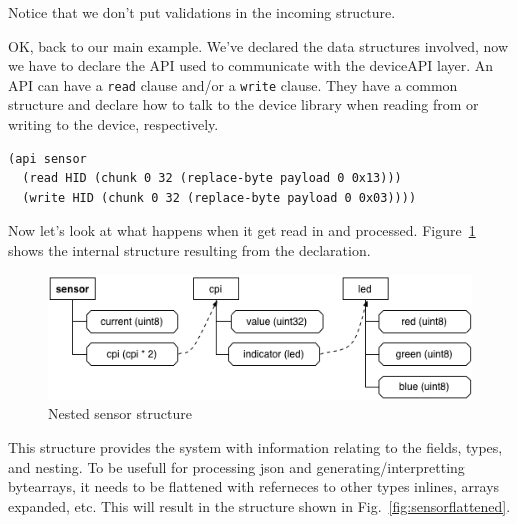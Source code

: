 \documentclass[12pt]{article}
\begin{document}
Notice that we don't put validations in the incoming structure.

OK, back to our main example.  We've declared the data structures
involved, now we have to declare the API used to communicate with the
deviceAPI layer. An API can have a \verb|read| clause and/or a
\verb|write| clause. They have a common structure and declare how to
talk to the device library when reading from or writing to the device,
respectively.

\begin{verbatim}
(api sensor
  (read HID (chunk 0 32 (replace-byte payload 0 0x13)))
  (write HID (chunk 0 32 (replace-byte payload 0 0x03))))
\end{verbatim}



Now let's look at what happens when it get
read in and processed. Figure~\ref{fig:sensornested} shows the
internal structure resulting from the declaration.

\begin{figure}[htbp] %
   \centering
   \includegraphics[width=6in]{sensor_nested.png} 
\caption{Nested sensor structure}
\label{fig:sensornested}
\end{figure}

This structure provides the system with information relating to the
fields, types, and nesting. To be usefull for processing json and
generating/interpretting bytearrays, it needs to be flattened with
referneces to other types inlines, arrays expanded, etc. This will
result in the structure shown in Fig.~\ref{fig:sensorflattened}.
\end{document}
